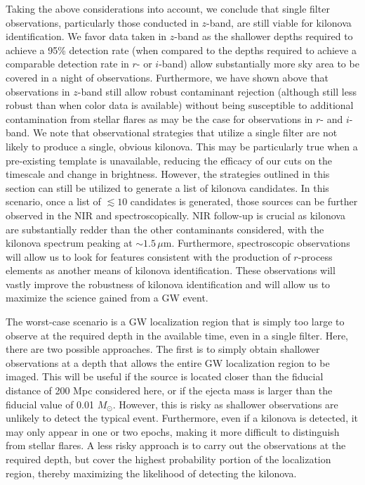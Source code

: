 Taking the above considerations into account, we conclude that single filter observations, particularly those conducted in $z$-band, are still viable for kilonova identification. We favor data taken in $z$-band as the shallower depths required to achieve a 95\% detection rate (when compared to the depths required to achieve a comparable detection rate in $r$- or $i$-band) allow substantially more sky area to be covered in a night of observations.  Furthermore, we have shown above that observations in $z$-band still allow robust contaminant rejection (although still less robust than when color data is available) without being susceptible to additional contamination from stellar flares as may be the case for observations in $r$- and $i$-band. We note that observational strategies that utilize a single filter are not likely to  produce a single, obvious kilonova. This may be particularly true when a pre-existing template is unavailable, reducing the efficacy of our cuts on the timescale and change in brightness. However, the strategies outlined in this section can still be utilized to generate a list of kilonova candidates. In this scenario, once a list of $\lesssim10$ candidates is generated, those sources can be further observed in the NIR and spectroscopically. NIR follow-up is crucial as kilonova are substantially redder than the other contaminants considered, with the kilonova spectrum peaking at $\sim1.5\,\mu$m. Furthermore, spectroscopic observations will allow us to look for features consistent with the production of $r$-process elements as another means of kilonova identification. These observations will vastly improve the robustness of kilonova identification and will allow us to maximize the science gained from a GW event.

The worst-case scenario is a GW localization region that is simply too large to observe at the required depth in the available time, even in a single filter. Here, there are two possible approaches. The first is to simply obtain shallower observations at a depth that allows the entire GW localization region to be imaged. This will be useful if the source is located closer than the fiducial distance of 200 Mpc considered here, or if the ejecta mass is larger than the fiducial value of 0.01 $M_{\odot}$. However, this is risky as shallower observations are unlikely to detect the typical event. Furthermore, even if a kilonova is detected, it may only appear in one or two epochs, making it more difficult to distinguish from stellar flares. A less risky approach is to carry out the observations at the required depth, but cover the highest probability portion of the localization region, thereby maximizing the likelihood of detecting the kilonova.

